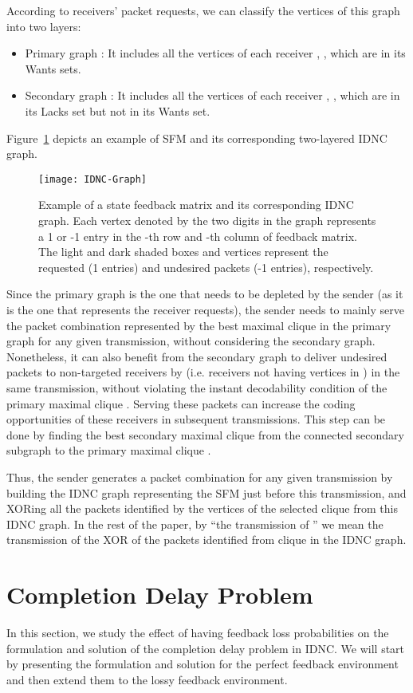 \documentclass[10pt,jounral]{IEEEtran}
\newcommand{\fref}[1]{Figure~\ref{#1}}
\begin{document}
According to receivers' packet requests, we can classify the vertices of this graph into two layers:
\begin{itemize}
\item Primary graph : It includes all the vertices of each receiver , , which are in its Wants sets.
\item Secondary graph : It includes all the vertices of each receiver , , which are in its Lacks set but not in its Wants set.
\end{itemize}
\fref{fig:IDNC-graph} depicts an example of SFM and its corresponding two-layered IDNC graph.
\begin{figure}[t]
\centering
\texttt{[image: IDNC-Graph]}\\
  \caption{Example of a state feedback matrix and its corresponding IDNC graph. Each vertex denoted by the two digits  in the graph represents a 1 or -1 entry in the -th row and -th column of feedback matrix. The light and dark shaded boxes and vertices represent the requested (1 entries) and undesired packets (-1 entries), respectively.}\label{fig:IDNC-graph}
\end{figure}
Since the primary graph is the one that needs to be depleted by the sender (as it is the one that represents the receiver requests), the sender needs to mainly serve the packet combination represented by the best maximal clique  in the primary graph for any given transmission, without considering the secondary graph. Nonetheless, it can also benefit from the secondary graph to deliver undesired packets to non-targeted receivers by  (i.e. receivers not having vertices in ) in the same transmission, without violating the instant decodability condition of the primary maximal clique . Serving these packets can increase the coding opportunities of these receivers in subsequent transmissions. This step can be done by finding the best secondary maximal clique  from the connected secondary subgraph to the primary maximal clique .

Thus, the sender generates a packet combination for any given transmission by building the IDNC graph representing the SFM just before this transmission, and XORing all the packets identified by the vertices of the selected clique  from this IDNC graph. In the rest of the paper, by ``the transmission of '' we mean the transmission of the XOR of the packets identified from clique  in the IDNC graph.


\section{Completion Delay Problem} \label{sec:CD-extension}
In this section, we study the effect of having feedback loss probabilities on the formulation and solution of the completion delay problem in IDNC. We will start by presenting the formulation and solution for the perfect feedback environment and then extend them to the lossy feedback environment.
\end{document}
